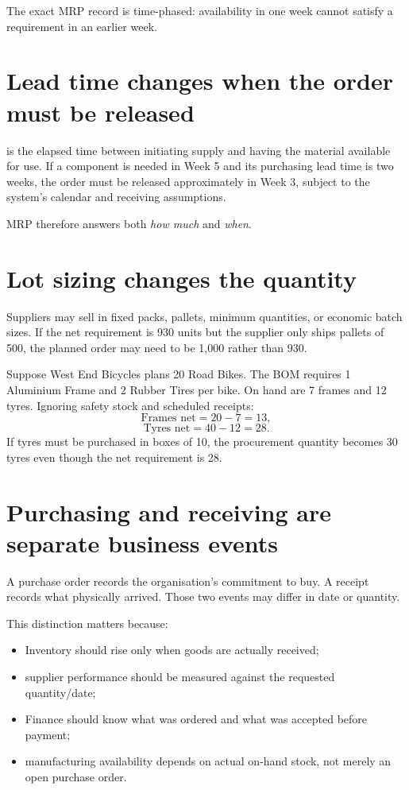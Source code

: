 The exact MRP record is time-phased: availability in one week cannot satisfy a requirement in an earlier week.

\section{Lead time changes when the order must be released}

 is the elapsed time between initiating supply and having the material available for use. If a component is needed in Week 5 and its purchasing lead time is two weeks, the order must be released approximately in Week 3, subject to the system's calendar and receiving assumptions.

MRP therefore answers both \emph{how much} and \emph{when}.

\section{Lot sizing changes the quantity}

Suppliers may sell in fixed packs, pallets, minimum quantities, or economic batch sizes. If the net requirement is 930 units but the supplier only ships pallets of 500, the planned order may need to be 1,000 rather than 930.

\begin{workedexample}
Suppose West End Bicycles plans 20 Road Bikes. The BOM requires 1 Aluminium Frame and 2 Rubber Tires per bike. On hand are 7 frames and 12 tyres. Ignoring safety stock and scheduled receipts:
\[
\text{Frames net}=20-7=13,
\]
\[
\text{Tyres net}=40-12=28.
\]
If tyres must be purchased in boxes of 10, the procurement quantity becomes 30 tyres even though the net requirement is 28.
\end{workedexample}

\section{Purchasing and receiving are separate business events}

A purchase order records the organisation's commitment to buy. A receipt records what physically arrived. Those two events may differ in date or quantity.

This distinction matters because:

\begin{itemize}
  \item Inventory should rise only when goods are actually received;
  \item supplier performance should be measured against the requested quantity/date;
  \item Finance should know what was ordered and what was accepted before payment;
  \item manufacturing availability depends on actual on-hand stock, not merely an open purchase order.
\end{itemize}

